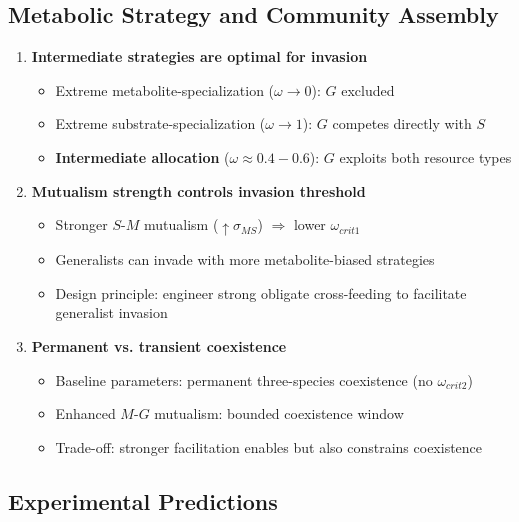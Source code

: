 \documentclass[11pt]{article}
\begin{document}
\subsection{Metabolic Strategy and Community Assembly}

\begin{enumerate}
    \item \textbf{Intermediate strategies are optimal for invasion}
    \begin{itemize}
        \item Extreme metabolite-specialization ($\omega \to 0$): $G$ excluded
        \item Extreme substrate-specialization ($\omega \to 1$): $G$ competes directly with $S$
        \item \textbf{Intermediate allocation} ($\omega \approx 0.4-0.6$): $G$ exploits both resource types
    \end{itemize}

    \item \textbf{Mutualism strength controls invasion threshold}
    \begin{itemize}
        \item Stronger $S$-$M$ mutualism ($\uparrow \sigma_{MS}$) $\Rightarrow$ lower $\omega_{crit1}$
        \item Generalists can invade with more metabolite-biased strategies
        \item Design principle: engineer strong obligate cross-feeding to facilitate generalist invasion
    \end{itemize}

    \item \textbf{Permanent vs. transient coexistence}
    \begin{itemize}
        \item Baseline parameters: permanent three-species coexistence (no $\omega_{crit2}$)
        \item Enhanced $M$-$G$ mutualism: bounded coexistence window
        \item Trade-off: stronger facilitation enables but also constrains coexistence
    \end{itemize}
\end{enumerate}

\subsection{Experimental Predictions}
\end{document}
